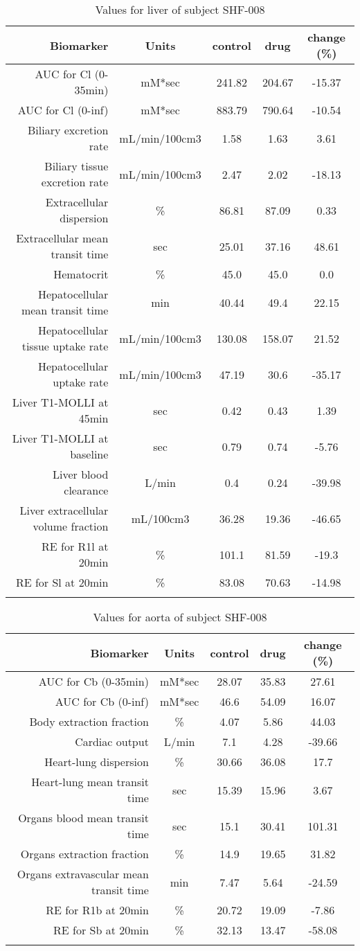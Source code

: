 \documentclass{epflreport}%
\begin{document}
%
\clearpage%
\begin{longtable}{rcccc}%
\hline%
Biomarker&Units&control&drug&change (\%)\\%
\hline%
AUC for Cl (0{-}35min)&mM*sec&241.82&204.67&{-}15.37\\%
AUC for Cl (0{-}inf)&mM*sec&883.79&790.64&{-}10.54\\%
Biliary excretion rate&mL/min/100cm3&1.58&1.63&3.61\\%
Biliary tissue excretion rate&mL/min/100cm3&2.47&2.02&{-}18.13\\%
Extracellular dispersion&\%&86.81&87.09&0.33\\%
Extracellular mean transit time&sec&25.01&37.16&48.61\\%
Hematocrit&\%&45.0&45.0&0.0\\%
Hepatocellular mean transit time&min&40.44&49.4&22.15\\%
Hepatocellular tissue uptake rate&mL/min/100cm3&130.08&158.07&21.52\\%
Hepatocellular uptake rate&mL/min/100cm3&47.19&30.6&{-}35.17\\%
Liver T1{-}MOLLI at 45min&sec&0.42&0.43&1.39\\%
Liver T1{-}MOLLI at baseline&sec&0.79&0.74&{-}5.76\\%
Liver blood clearance&L/min&0.4&0.24&{-}39.98\\%
Liver extracellular volume fraction&mL/100cm3&36.28&19.36&{-}46.65\\%
RE for R1l at 20min&\%&101.1&81.59&{-}19.3\\%
RE for Sl at 20min&\%&83.08&70.63&{-}14.98\\%
\hline%
\caption{Values for liver of subject SHF-008} \\%
\end{longtable}%
\begin{longtable}{rcccc}%
\hline%
Biomarker&Units&control&drug&change (\%)\\%
\hline%
AUC for Cb (0{-}35min)&mM*sec&28.07&35.83&27.61\\%
AUC for Cb (0{-}inf)&mM*sec&46.6&54.09&16.07\\%
Body extraction fraction&\%&4.07&5.86&44.03\\%
Cardiac output&L/min&7.1&4.28&{-}39.66\\%
Heart{-}lung dispersion&\%&30.66&36.08&17.7\\%
Heart{-}lung mean transit time&sec&15.39&15.96&3.67\\%
Organs blood mean transit time&sec&15.1&30.41&101.31\\%
Organs extraction fraction&\%&14.9&19.65&31.82\\%
Organs extravascular mean transit time&min&7.47&5.64&{-}24.59\\%
RE for R1b at 20min&\%&20.72&19.09&{-}7.86\\%
RE for Sb at 20min&\%&32.13&13.47&{-}58.08\\%
\hline%
\caption{Values for aorta of subject SHF-008} \\%
\end{longtable}%
\clearpage%
\end{document}
